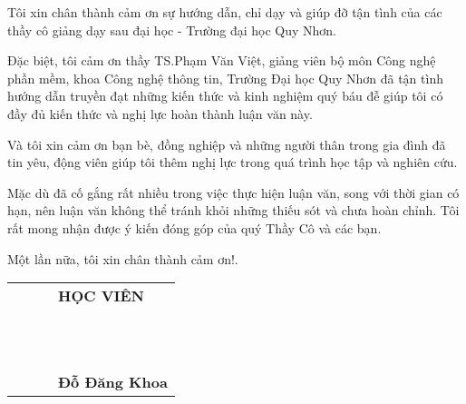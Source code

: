 
Tôi xin chân thành cảm ơn sự hướng dẫn, chỉ dạy và giúp đỡ tận tình của các thầy cô giảng dạy sau đại học - Trường đại học Quy Nhơn.

Đặc biệt, tôi cảm ơn thầy TS.Phạm Văn Việt, giảng viên bộ môn Công nghệ phần mềm, khoa Công nghệ thông tin, Trường Đại học Quy Nhơn đã tận tình hướng dẫn truyền đạt những kiến thức và kinh nghiệm quý báu đễ giúp tôi có đầy đủ kiến thức và nghị lực hoàn thành luận văn này.

Và tôi xin cảm ơn bạn bè, đồng nghiệp và những người thân trong gia đình đã tin yêu, động viên giúp tôi thêm nghị lực trong quá trình học tập và nghiên cứu.

Mặc dù đã cố gắng rất nhiều trong việc thực hiện luận văn, song với thời gian có hạn, nên luận văn không thể tránh khỏi những thiếu sót và chưa hoàn chỉnh. Tôi rất mong nhận được ý kiến đóng góp của quý Thầy Cô và các bạn.

Một lần nữa, tôi xin chân thành cảm ơn!.


\begin{tabu} to 1.0 \textwidth {  X[c] X[c]  X[c]  X[c]  }

	 & &  & \textbf{HỌC VIÊN} \\
	 \\ \\ \\ \\ \\ \\ \\ \\ \\ \\ \\ 
	 & &  & \textbf{Đỗ Đăng Khoa}  \\
         
       \end{tabu}


